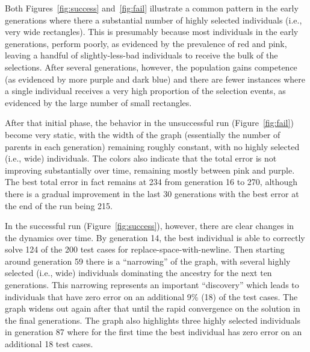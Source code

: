 \documentclass{sig-alternate}
\begin{document}
Both Figures~\ref{fig:success} and~\ref{fig:fail} illustrate a common pattern in the early generations where there a substantial number of highly selected individuals (i.e., very wide rectangles). This is presumably because most individuals in the early generations, perform poorly, as evidenced by the prevalence of red and pink, leaving a handful of slightly-less-bad individuals to receive the bulk of the selections. After several generations, however, the population gains competence (as evidenced by more purple and dark blue) and there are fewer instances where a single individual receives a very high proportion of the selection events, as evidenced by the large number of small rectangles.

After that initial phase, the behavior in the unsuccessful run (Figure~\ref{fig:fail}) become very static, with the width of the graph (essentially the number of parents in each generation) remaining roughly constant, with no highly selected (i.e., wide) individuals. The colors also indicate that the total error is not improving substantially over time, remaining mostly between pink and purple. The best total error in fact remains at 234 from generation 16 to 270, although there is a gradual improvement in the last 30 generations with the best error at the end of the run being 215.

In the successful run (Figure~\ref{fig:success}), however, there are clear changes in the dynamics over time. By generation 14, the best individual is able to correctly solve 124 of the 200 test cases for replace-space-with-newline. Then starting around generation 59 there is a ``narrowing'' of the graph, with several highly selected (i.e., wide) individuals dominating the ancestry for the next ten generations. This narrowing represents an important ``discovery'' which leads to individuals that have zero error on an additional 9\% (18) of the test cases. The graph widens out again after that until the rapid convergence on the solution in the final generations. The graph also highlights three highly selected individuals in generation 87 where for the first time the best individual has zero error on an additional 18 test cases.



\end{document}
